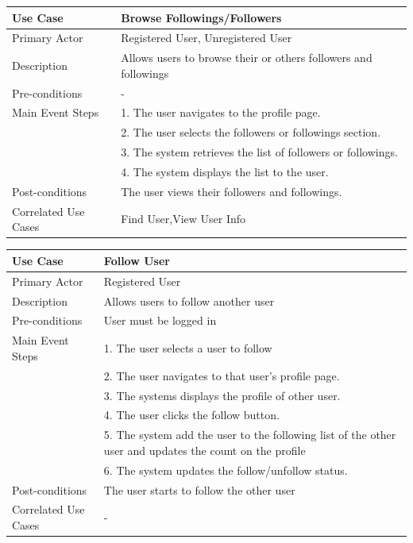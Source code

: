 \begin{longtable}{|p{}|p{}|}
    \hline
    \rowcolor{lightblue}
    \textbf{Use Case} & \textbf{Browse Followings/Followers} \\
    \hline
    Primary Actor & Registered User, Unregistered User\\
    \hline
    Description & Allows users to browse their or others followers and followings\\
    \hline
    Pre-conditions & - \\
    \hline
    Main Event Steps & 1. The user navigates to the profile page.\\
    & 2. The user selects the followers or followings section. \\
    & 3. The system retrieves the list of followers or followings. \\
    & 4. The system displays the list to the user. \\
    \hline
    Post-conditions & The user views their followers and followings.\\
    \hline
    Correlated Use Cases &Find User,View User Info \\
    \hline
\end{longtable}

\newpage

\begin{longtable}{|p{}|p{}|}
    \hline
    \rowcolor{lightblue}
    \textbf{Use Case} & \textbf{Follow User} \\
    \hline
    Primary Actor & Registered User\\
    \hline
    Description & Allows users to follow another user\\
    \hline
    Pre-conditions & User must be logged in\\
    \hline
    Main Event Steps &  1. The user selects a user to follow \\
    & 2. The user navigates to that user's profile page. \\
    & 3. The systems displays the profile of other user. \\
    & 4. The user clicks the follow button. \\
    & 5. The system add the user to the following list of the other user and updates the count on the profile \\
    & 6. The system updates the follow/unfollow status. \\
    \hline
    Post-conditions &The user starts to follow the other user \\
    \hline
    Correlated Use Cases & -\\
    \hline
\end{longtable}


